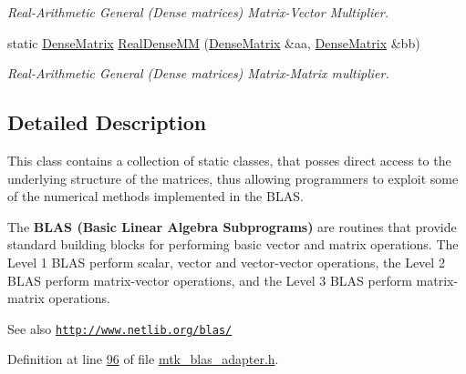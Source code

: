 \begin{DoxyCompactItemize}
\begin{DoxyCompactList}\small\item\em Real-\/\+Arithmetic General (Dense matrices) Matrix-\/\+Vector Multiplier. \end{DoxyCompactList}\item 
static \hyperlink{classmtk_1_1DenseMatrix}{Dense\+Matrix} \hyperlink{classmtk_1_1BLASAdapter_acebd0e9bfe0bdd609c7fbea98ccfd3b5}{Real\+Dense\+M\+M} (\hyperlink{classmtk_1_1DenseMatrix}{Dense\+Matrix} \&aa, \hyperlink{classmtk_1_1DenseMatrix}{Dense\+Matrix} \&bb)
\begin{DoxyCompactList}\small\item\em Real-\/\+Arithmetic General (Dense matrices) Matrix-\/\+Matrix multiplier. \end{DoxyCompactList}\end{DoxyCompactItemize}


\subsection{Detailed Description}
This class contains a collection of static classes, that posses direct access to the underlying structure of the matrices, thus allowing programmers to exploit some of the numerical methods implemented in the B\+L\+A\+S.

The {\bfseries B\+L\+A\+S (Basic Linear Algebra Subprograms)} are routines that provide standard building blocks for performing basic vector and matrix operations. The Level 1 B\+L\+A\+S perform scalar, vector and vector-\/vector operations, the Level 2 B\+L\+A\+S perform matrix-\/vector operations, and the Level 3 B\+L\+A\+S perform matrix-\/matrix operations.

\begin{DoxySeeAlso}{See also}
\href{http://www.netlib.org/blas/}{\tt http\+://www.\+netlib.\+org/blas/} 
\end{DoxySeeAlso}


Definition at line \hyperlink{mtk__blas__adapter_8h_source_l00096}{96} of file \hyperlink{mtk__blas__adapter_8h_source}{mtk\+\_\+blas\+\_\+adapter.\+h}.



